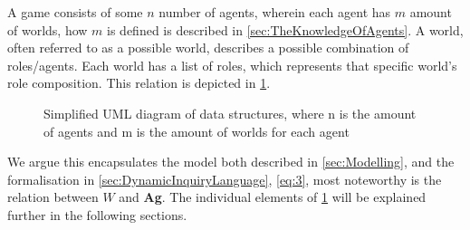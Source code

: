 A game consists of some $n$ number of agents, wherein each agent has $m$ amount
of worlds, how $m$ is defined is described in \cref{sec:TheKnowledgeOfAgents}. A world, often
referred to as a possible world, describes a possible combination of
roles/agents. Each world has a list of roles, which represents that specific
world's role composition. This relation is depicted in \cref{fig:DataStructuresUML}.
\renewcommand{\umlfillcolor}{white}
\renewcommand{\umldrawcolor}{blue}
\begin{figure}[H]
	\centering
	\vspace*{3mm}
	\caption{Simplified UML diagram of data structures, where n is the amount of agents and m is the amount of worlds for each agent}
	\label{fig:DataStructuresUML}
\end{figure}
We argue this encapsulates the model both described in \cref{sec:Modelling}, and the formalisation in
\cref{sec:DynamicInquiryLanguage}, \cref{eq:3}, most noteworthy is the relation between $W$ and \textbf{Ag}. The individual elements of \cref{fig:DataStructuresUML} will be explained further in the following sections.
